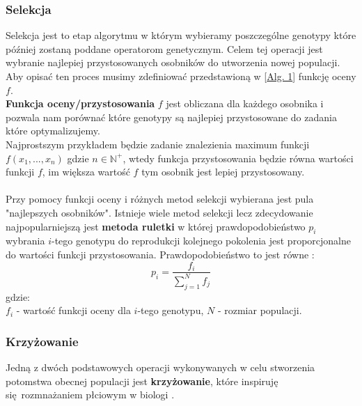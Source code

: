 \documentclass{article}
\begin{document}
\subsubsection{Selekcja}
Selekcja jest to etap algorytmu w którym wybieramy poszczególne genotypy które później zostaną 
poddane operatorom genetycznym. Celem tej operacji jest wybranie najlepiej przystosowanych
osobników do utworzenia nowej populacji.
Aby opisać ten proces musimy zdefiniować przedstawioną w [\hyperref[alg:ag]{Alg. 1}]
funkcję oceny $f$.\\
\textbf{Funkcja oceny/przystosowania} $f$ jest obliczana dla każdego osobnika i pozwala nam
porównać które genotypy są najlepiej przystosowane do zadania które optymalizujemy.\\
Najprostszym przykładem będzie zadanie znalezienia maximum funkcji 
$f(x_1, ..., x_n)$ gdzie $n \in \mathbb{N}^{+}$, wtedy funkcja przystosowania
będzie równa wartości funkcji $f$, im większa wartość $f$ tym osobnik jest
lepiej przystosowany.\\\\
Przy pomocy funkcji oceny i różnych metod selekcji wybierana jest pula "najlepszych osobników".
Istnieje wiele metod selekcji lecz zdecydowanie najpopularniejszą jest \textbf{metoda ruletki}
w której prawdopodobieństwo $p_i$
wybrania $i$-tego genotypu do reprodukcji kolejnego pokolenia jest proporcjonalne do wartości
funkcji przystosowania. Prawdopodobieństwo to jest równe \cite{goldberg}:\\
\begin{equation}
	p_i = \frac{f_i}{\sum_{j=1}^{N} f_j}
\end{equation}
gdzie:\\
$f_i$ - wartość funkcji oceny dla $i$-tego genotypu, $N$ - rozmiar populacji.\\

\subsubsection{Krzyżowanie}
Jedną z dwóch podstawowych operacji wykonywanych w celu stworzenia potomstwa obecnej populacji
jest \textbf{krzyżowanie}, które inspiruję się rozmnażaniem płciowym w biologi \cite{cross}.
\end{document}
